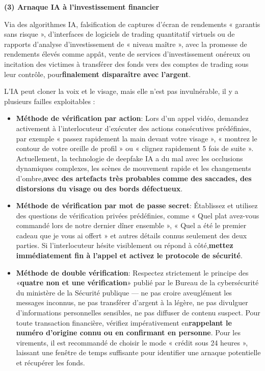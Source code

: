 \textbf{(3) Arnaque IA à l'investissement financier}\par

Via des algorithmes IA, falsification de captures d'écran de rendements « garantis sans risque », d'interfaces de logiciels de trading quantitatif virtuels ou de rapports d'analyse d'investissement de « niveau maître », avec la promesse de rendements élevés comme appât, vente de services d'investissement onéreux ou incitation des victimes à transférer des fonds vers des comptes de trading sous leur contrôle, pour\textbf{finalement disparaître avec l'argent}.


L'IA peut cloner la voix et le visage, mais elle n'est pas invulnérable, il y a plusieurs failles exploitables :

\begin{itemize}
  \item \textbf{Méthode de vérification par action}: Lors d'un appel vidéo, demandez activement à l'interlocuteur d'exécuter des actions consécutives prédéfinies, par exemple « passez rapidement la main devant votre visage », « montrez le contour de votre oreille de profil » ou « clignez rapidement 5 fois de suite ». Actuellement, la technologie de deepfake IA a du mal avec les occlusions dynamiques complexes, les scènes de mouvement rapide et les changements d'ombre,\textbf{avec des artefacts très probables comme des saccades, des distorsions du visage ou des bords défectueux}.
  \item \textbf{Méthode de vérification par mot de passe secret}: Établissez et utilisez des questions de vérification privées prédéfinies, comme « Quel plat avez-vous commandé lors de notre dernier dîner ensemble », « Quel a été le premier cadeau que je vous ai offert » et autres détails connus seulement des deux parties. Si l'interlocuteur hésite visiblement ou répond à côté,\textbf{mettez immédiatement fin à l'appel et activez le protocole de sécurité}.
  \item \textbf{Méthode de double vérification}: Respectez strictement le principe des «\textbf{quatre non et une vérification}» publié par le Bureau de la cybersécurité du ministère de la Sécurité publique — ne pas croire aveuglément les messages inconnus, ne pas transférer d'argent à la légère, ne pas divulguer d'informations personnelles sensibles, ne pas diffuser de contenu suspect. Pour toute transaction financière, vérifiez impérativement en\textbf{rappelant le numéro d'origine connu ou en confirmant en personne}. Pour les virements, il est recommandé de choisir le mode « crédit sous 24 heures », laissant une fenêtre de temps suffisante pour identifier une arnaque potentielle et récupérer les fonds.
\end{itemize}

